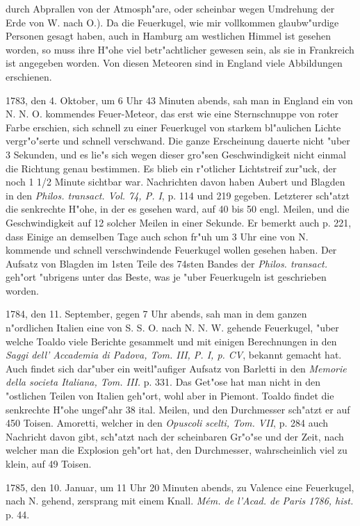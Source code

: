 \documentclass[a4paper, 11pt, oneside, polutonikogreek, german]{article}
\begin{document}
durch Abprallen von der Atmosph"are, oder scheinbar wegen Umdrehung der Erde von W. nach O.). Da die Feuerkugel, wie mir vollkommen glaubw"urdige Personen gesagt haben, auch in Hamburg am westlichen Himmel ist gesehen worden, so muss ihre H"ohe viel betr"achtlicher gewesen sein, als sie in Frankreich ist angegeben worden. Von diesen Meteoren sind in England viele Abbildungen erschienen.

1783, den 4. Oktober, um 6 Uhr 43 Minuten abends, sah man in England ein von N. N. O. kommendes Feuer-Meteor, das erst wie eine Sternschnuppe von roter Farbe erschien, sich schnell zu einer Feuerkugel von starkem bl"aulichen Lichte vergr"o"serte und schnell verschwand. Die ganze Erscheinung dauerte nicht "uber 3 Sekunden, und es lie"s sich wegen dieser gro"sen Geschwindigkeit nicht einmal die Richtung genau bestimmen. Es blieb ein r"otlicher Lichtstreif zur"uck, der noch 1 1/2 Minute sichtbar war. Nachrichten davon haben Aubert und Blagden in den \emph{Philos. transact. Vol. 74, P. I}, p. 114 und 219 gegeben. Letzterer sch"atzt die senkrechte H"ohe, in der es gesehen ward, auf 40 bis 50 engl. Meilen, und die Geschwindigkeit auf 12 solcher Meilen in einer Sekunde. Er bemerkt auch p. 221, dass Einige an demselben Tage auch schon fr"uh um 3 Uhr eine von N. kommende und schnell verschwindende Feuerkugel wollen gesehen haben. Der Aufsatz von Blagden im 1sten Teile des 74sten Bandes der \emph{Philos. transact.} geh"ort "ubrigens unter das Beste, was je "uber Feuerkugeln ist geschrieben worden.

1784, den 11. September, gegen 7 Uhr abends, sah man in dem ganzen n"ordlichen Italien eine von S. S. O. nach N. N. W. gehende Feuerkugel, "uber welche Toaldo viele Berichte gesammelt und mit einigen Berechnungen in den \emph{Saggi dell' Accademia di Padova, Tom. III, P. I, p. CV}, bekannt gemacht hat. Auch findet sich dar"uber ein weitl"aufiger Aufsatz von Barletti in den \emph{Memorie della societa Italiana, Tom. III.} p. 331. Das Get"ose hat man nicht in den "ostlichen Teilen von Italien geh"ort, wohl aber in Piemont. Toaldo findet die senkrechte H"ohe ungef"ahr 38 ital. Meilen, und den Durchmesser sch"atzt er auf 450 Toisen. Amoretti, welcher in den \emph{Opuscoli scelti, Tom. VII}, p. 284 auch Nachricht davon gibt, sch"atzt nach der scheinbaren Gr"o"se und der Zeit, nach welcher man die Explosion geh"ort hat, den Durchmesser, wahrscheinlich viel zu klein, auf 49 Toisen.

1785, den 10. Januar, um 11 Uhr 20 Minuten abends, zu Valence eine Feuerkugel, nach N. gehend, zersprang mit einem Knall. \emph{Mém. de l'Acad. de Paris 1786, hist.} p. 44.
\end{document}
